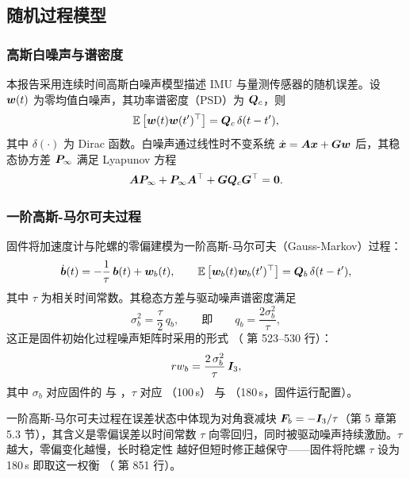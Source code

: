 \subsection{随机过程模型}

\subsubsection{高斯白噪声与谱密度}

本报告采用连续时间高斯白噪声模型描述 IMU 与量测传感器的随机误差。设
$\boldsymbol{w}(t)$ 为零均值白噪声，其功率谱密度（PSD）为 $\boldsymbol{Q}_c$，则
\begin{equation}
  \mathbb{E}\left[\boldsymbol{w}(t)\boldsymbol{w}(t')^{\top}\right] = \boldsymbol{Q}_c\,\delta(t - t'),
  \label{eq:white-noise}
\end{equation}
其中 $\delta(\cdot)$ 为 Dirac 函数。白噪声通过线性时不变系统
$\dot{\boldsymbol{x}} = \boldsymbol{A}\boldsymbol{x} + \boldsymbol{G}\boldsymbol{w}$ 后，其稳态协方差
$\boldsymbol{P}_{\infty}$ 满足 Lyapunov 方程
\begin{equation}
  \boldsymbol{A}\boldsymbol{P}_{\infty} + \boldsymbol{P}_{\infty}\boldsymbol{A}^{\top} + \boldsymbol{G}\boldsymbol{Q}_c\boldsymbol{G}^\top = \boldsymbol{0}.
  \label{eq:lyapunov}
\end{equation}

\subsubsection{一阶高斯-马尔可夫过程}

固件将加速度计与陀螺的零偏建模为一阶高斯-马尔可夫（Gauss-Markov）过程：
\begin{equation}
  \dot{\boldsymbol{b}}(t) = -\frac{1}{\tau}\,\boldsymbol{b}(t) + \boldsymbol{w}_b(t),
  \qquad
  \mathbb{E}\left[\boldsymbol{w}_b(t)\boldsymbol{w}_b(t')^{\top}\right] = \boldsymbol{Q}_b\,\delta(t-t'),
  \label{eq:gm-process}
\end{equation}
其中 $\tau$ 为相关时间常数。其稳态方差与驱动噪声谱密度满足
\begin{equation}
  \sigma_b^2 = \frac{\tau}{2}\,q_b,
  \qquad\text{即}\qquad
  q_b = \frac{2\sigma_b^2}{\tau},
  \label{eq:gm-variance}
\end{equation}
这正是固件初始化过程噪声矩阵时采用的形式
（ 第 523--530 行）：
\begin{equation}
  rw_{b} = \frac{2\,\sigma_{b}^2}{\tau}\,\boldsymbol{I}_3,
  \label{eq:gm-rw}
\end{equation}
其中 $\sigma_b$ 对应固件的  与
，$\tau$ 对应 （100\,s）
与 （180\,s，固件运行配置）。

\begin{remark}
一阶高斯-马尔可夫过程在误差状态中体现为对角衰减块
$\boldsymbol{F}_{b} = -\boldsymbol{I}_3/\tau$（第 5 章第 5.3 节），其含义是零偏误差以时间常数
$\tau$ 向零回归，同时被驱动噪声持续激励。$\tau$ 越大，零偏变化越慢，长时稳定性
越好但短时修正越保守——固件将陀螺 $\tau$ 设为 180\,s 即取这一权衡
（ 第 851 行）。
\end{remark}

